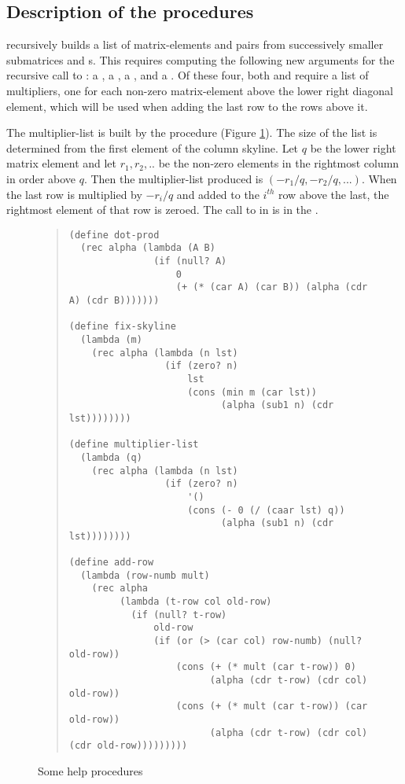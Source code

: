 \subsection{Description of the procedures}

 recursively builds a list of matrix-elements and 
pairs from successively smaller submatrices and s. This requires
computing the following new arguments for the recursive call to :
a , a , a , and a
.  Of these four, both  and  require a
list of multipliers, one for each non-zero matrix-element above the lower
right diagonal element, which will be used when adding the last row to the
rows above it.

The multiplier-list is built by the procedure 
(Figure \ref{fig:help}).  The
size of the list is determined from the first element of the column skyline.
Let $q$ be the lower right matrix element and let $r_1,r_2,..$ be the
non-zero elements in the rightmost column in order above $q$.  Then the
multiplier-list produced is $(-r_1/q,-r_2/q,...)$.  When the last row is
multiplied by $-r_i/q$ and added to the $i^{th}$ row above the last, the
rightmost element of that row is zeroed.  The call to 
in  is in the .

\begin{figure}
\begin{frameit}
\begin{quote}
\begin{verbatim}
(define dot-prod
  (rec alpha (lambda (A B)
               (if (null? A)
                   0
                   (+ (* (car A) (car B)) (alpha (cdr A) (cdr B)))))))

(define fix-skyline
  (lambda (m)
    (rec alpha (lambda (n lst)
                 (if (zero? n)
                     lst
                     (cons (min m (car lst))
                           (alpha (sub1 n) (cdr lst))))))))

(define multiplier-list
  (lambda (q)
    (rec alpha (lambda (n lst)
                 (if (zero? n)
                     '()
                     (cons (- 0 (/ (caar lst) q))
                           (alpha (sub1 n) (cdr lst))))))))

(define add-row
  (lambda (row-numb mult)
    (rec alpha
         (lambda (t-row col old-row)
           (if (null? t-row)
               old-row
               (if (or (> (car col) row-numb) (null? old-row))
                   (cons (+ (* mult (car t-row)) 0)
                         (alpha (cdr t-row) (cdr col) old-row))
                   (cons (+ (* mult (car t-row)) (car old-row))
                         (alpha (cdr t-row) (cdr col) (cdr old-row)))))))))
\end{verbatim}
\end{quote}
\caption{Some help procedures}
\label{fig:help}
\end{frameit}
\end{figure}


